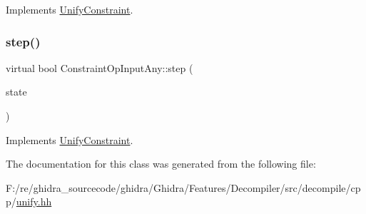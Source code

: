 Implements \mbox{\hyperlink{class_unify_constraint_a774f6a611a96384766cb8e8d8f5ff41f}{Unify\+Constraint}}.

\mbox{\label{class_constraint_op_input_any_a319f53489a8bea35df0359d26dc5f547}} 
\subsubsection{\texorpdfstring{step()}{step()}}
{\footnotesize\ttfamily virtual bool Constraint\+Op\+Input\+Any\+::step (\begin{DoxyParamCaption}\item[{\mbox{\hyperlink{class_unify_state}{Unify\+State}} \&}]{state }\end{DoxyParamCaption})\hspace{0.3cm}{\ttfamily [virtual]}}



Implements \mbox{\hyperlink{class_unify_constraint_ad9ab4ad91037f96bf803735d414d212d}{Unify\+Constraint}}.



The documentation for this class was generated from the following file\+:\begin{DoxyCompactItemize}
\item 
F\+:/re/ghidra\+\_\+sourcecode/ghidra/\+Ghidra/\+Features/\+Decompiler/src/decompile/cpp/\mbox{\hyperlink{unify_8hh}{unify.\+hh}}\end{DoxyCompactItemize}
